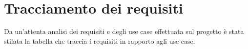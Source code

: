 





\section{Tracciamento dei requisiti}

Da un'attenta analisi dei requisiti e degli use case effettuata sul progetto è stata stilata la tabella che traccia i requisiti in rapporto agli use case.\\



